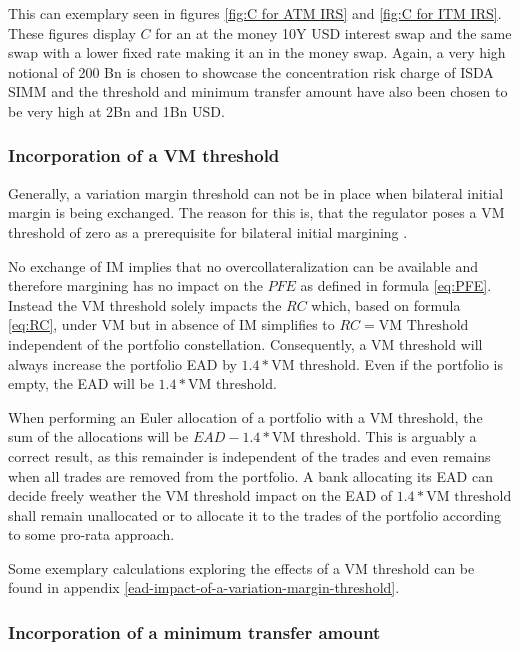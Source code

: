 \documentclass[../Thesis_AHoecherl.tex]{subfiles}
\begin{document}
    This can exemplary seen in figures \ref{fig:C for ATM IRS} and \ref{fig:C for ITM IRS}. These figures display $C$ for an at the money 10Y USD interest swap and the same swap with a lower fixed rate making it an in the money swap. Again, a very high notional of 200 Bn is chosen to showcase the concentration risk charge of \gls{ISDA SIMM} and the threshold and minimum transfer amount have also been chosen to be very high at 2Bn and 1Bn USD.

    \subsubsection{Incorporation of a VM threshold\label{sec:Incorporation of a VM threshold}}
    
    Generally, a variation margin threshold can not be in place when bilateral initial margin is being exchanged. The reason for this is, that the regulator poses a \gls{VM} threshold of zero as a prerequisite for bilateral initial margining \cite[Requirement 2.1]{BCBS_MarginRequirements}.

    No exchange of \gls{IM} implies that no overcollateralization can be available and therefore margining has no impact on the $PFE$ as defined in formula \ref{eq:PFE}. Instead the \gls{VM} threshold solely impacts the $RC$ which, based on formula \ref{eq:RC}, under \gls{VM} but in absence of \gls{IM} simplifies to $RC = \text{VM Threshold}$ independent of the portfolio constellation. 
    Consequently, a \gls{VM} threshold will always increase the portfolio \gls{EAD} by $1.4*\text{VM threshold}$. Even if the portfolio is empty, the \gls{EAD} will be $1.4 * \text{VM threshold}$.

    When performing an Euler allocation of a portfolio with a \gls{VM} threshold, the sum of the allocations will be $EAD - 1.4 * \text{VM threshold}$. This is arguably a correct result, as this remainder is independent of the trades and even remains when all trades are removed from the portfolio. 
    A bank allocating its \gls{EAD} can decide freely weather the \gls{VM} threshold impact on the \gls{EAD} of $1.4 * \text{VM threshold}$ shall remain unallocated or to allocate it to the trades of the portfolio according to some pro-rata approach.

    Some exemplary calculations exploring the effects of a \gls{VM} threshold can be found in appendix \ref{ead-impact-of-a-variation-margin-threshold}.
    
    \subsubsection{Incorporation of a minimum transfer amount}
\end{document}
